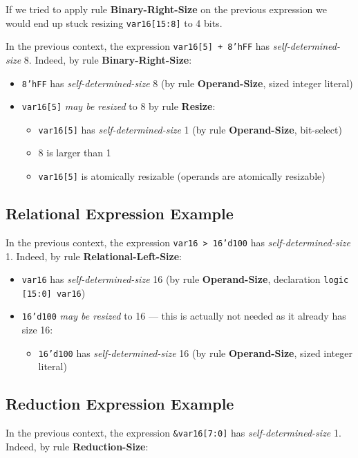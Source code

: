 \documentclass{article}
\newcommand{\sv}[1]{\texttt{#1}}
\newcommand{\sds}{\emph{self-determined-size}}
\newcommand{\mbr}{\emph{may be resized}}
\begin{document}
If we tried to apply rule \textbf{Binary-Right-Size} on the previous expression
we would end up stuck resizing \sv{var16[15:8]} to 4 bits.

In the previous context, the expression \sv{var16[5] + 8'hFF} has
\sds{} 8. Indeed, by rule \textbf{Binary-Right-Size}:

\begin{itemize}
  \item \sv{8'hFF} has \sds{} 8 (by rule
    \textbf{Operand-Size}, sized integer literal)
  \item \sv{var16[5]} \mbr{} to 8 by rule \textbf{Resize}:
    \begin{itemize}
      \item \sv{var16[5]} has \sds{} 1 (by rule
        \textbf{Operand-Size}, bit-select)
      \item 8 is larger than 1
      \item \sv{var16[5]} is atomically resizable (operands are
        atomically resizable)
    \end{itemize}
\end{itemize}

\subsection{Relational Expression Example}

In the previous context, the expression \sv{var16 > 16'd100} has
\sds{} 1. Indeed, by rule \textbf{Relational-Left-Size}:

\begin{itemize}
  \item \sv{var16} has \sds{} 16 (by rule
    \textbf{Operand-Size}, declaration \sv{logic [15:0] var16})
  \item \sv{16'd100} \mbr{} to 16 --- this is actually not
    needed as it already has size 16:
    \begin{itemize}
      \item \sv{16'd100} has \sds{} 16 (by rule
        \textbf{Operand-Size}, sized integer literal)
    \end{itemize}
\end{itemize}

\subsection{Reduction Expression Example}

In the previous context, the expression \sv{&var16[7:0]} has
\sds{} 1. Indeed, by rule \textbf{Reduction-Size}:
\end{document}
